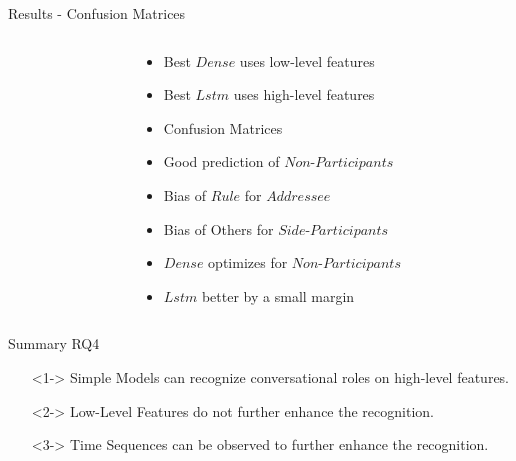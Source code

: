 \begin{frame}{Results - Confusion Matrices}
  \begin{columns}[T] %
    \begin{column}{.65\textwidth}
    \end{column}%
    \hspace{-10pt}
    \begin{column}{.45\textwidth}
      \footnotesize
      \vspace{10pt}
      \begin{itemize}[label=-]
        \item<1-> Best \(Dense\) uses low-level features
        \item<2-> Best \(Lstm\) uses high-level features
        \item<3->[] Confusion Matrices
        \item<4-> Good prediction of \(Non\text{-}Participants\)
        \item<5-> Bias of \(Rule\) for \(Addressee\)
        \item<6-> Bias of Others for \(Side\text{-}Participants\)
        \item<7-> \(Dense\) optimizes for \(Non\text{-}Participants\)
        \item<8-> \(Lstm\) better by a small margin
      \end{itemize}
      \vspace{10pt}
    \end{column}%
  \end{columns}
\end{frame}
\begin{frame}{Summary RQ4}
  \begin{itemize}
    \item[\textcolor{mygreen}{\faCheckCircle}]<1-> \textcolor{myblue}{Simple Models} can recognize conversational roles on high-level features.
    \item[\textcolor{myred}{\faTimesCircle}]<2-> \textcolor{myblue}{Low-Level Features} do not further enhance the recognition.
    \item[\textcolor{mygreen}{\faCheckCircle}]<3-> \textcolor{myblue}{Time Sequences} can be observed to further enhance the recognition.
  \end{itemize}
\end{frame}
